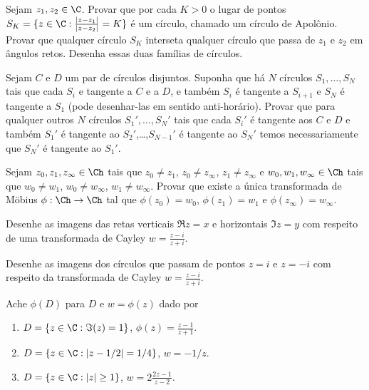 \begin{problema}
Sejam $z_1,z_2\in\C$. Provar que por cada $K>0$ o lugar de pontos
$S_K = \{z \in \C: \frac{|z-z_1|}{|z-z_2|} = K \}$ é um círculo, chamado um círculo de Apolônio.
Provar que qualquer círculo $S_K$ interseta qualquer círculo que passa de $z_1$ e $z_2$ em ângulos retos.
Desenha essas duas famílias de círculos.
\end{problema}

\begin{problema}
Sejam $C$ e $D$ um par de círculos disjuntos. Suponha que há $N$ círculos
$S_1,\dots,S_N$ tais que cada $S_i$ e tangente a $C$ e a $D$,
e também $S_i$ é tangente a $S_{i+1}$ e $S_N$ é tangente a $S_1$ (pode desenhar-las em sentido anti-horário).
Provar que para qualquer outros $N$ círculos $S_1',\dots,S_N'$ tais que
cada $S_i'$ é tangente aos $C$ e $D$ e também $S_1'$ é tangente ao $S_2'$,\dots,$S_{N-1}'$ é tangente ao $S_N'$
temos necessariamente que $S_N'$ é tangente ao $S_1'$.
\end{problema}

\begin{problema}
Sejam 
$z_0,z_1,z_\infty \in\Ch$ tais que $z_0\neq z_1$, $z_0\neq z_\infty$, $z_1\neq z_\infty$
e 
$w_0,w_1,w_\infty \in\Ch$ tais que $w_0\neq w_1$, $w_0\neq w_\infty$, $w_1\neq w_\infty$.
Provar que existe a única transformada de Möbius $\phi : \Ch \to \Ch$ tal que
$\phi(z_0) = w_0$, $\phi(z_1) = w_1$ e $\phi(z_\infty) = w_\infty$.
\end{problema}

\begin{problema}
Desenhe as imagens das retas verticais $\Re z = x$ e horizontais $\Im z = y$
com respeito de uma transformada de Cayley $w = \frac{z-i}{z+i}$.
\end{problema}

\begin{problema}
Desenhe as imagens dos círculos que passam de pontos $z=i$ e $z=-i$ com respeito da transformada
de Cayley $w = \frac{z-i}{z+i}$.
\end{problema}

\begin{problema}
Ache $\phi(D)$ para $D$ e $w=\phi(z)$ dado por
\begin{enumerate}
\item $D = \{z\in\C: \Im(z) = 1\}$, $\phi(z) = \frac{z-1}{z+1}$.
\item $D = \{z\in\C: |z-1/2| = 1/4\}$, $w = -1/z$.
\item $D = \{z\in\C: |z|\geq 1 \}$, $w = 2 \frac{2z-1}{z-2}$.
\end{enumerate}
\end{problema}
